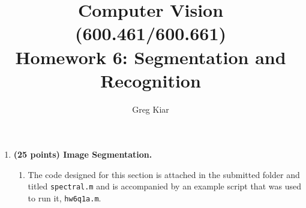 \documentclass[10pt]{article}
\begin{document}
\title{
\vspace{-19mm}
Computer Vision (600.461/600.661)\\
Homework 6: Segmentation and Recognition}
\author{Greg Kiar}


\maketitle

\begin{enumerate}

\item \textbf{(25 points) Image Segmentation.}
\begin{enumerate}

\item The code designed for this section is attached in the submitted folder and titled \texttt{spectral.m} and is accompanied by an example script that was used to run it, \texttt{hw6q1a.m}.


\end{enumerate}
\end{enumerate}
\end{document}
